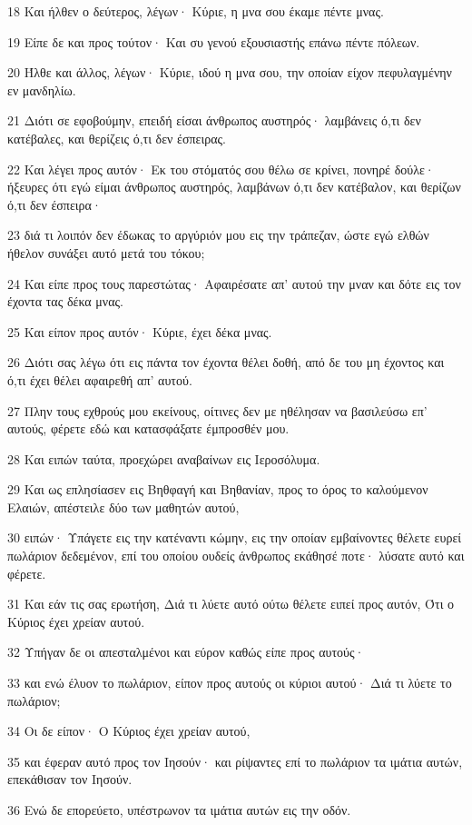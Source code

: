 \par 18 Και ήλθεν ο δεύτερος, λέγων· Κύριε, η μνα σου έκαμε πέντε μνας.
\par 19 Είπε δε και προς τούτον· Και συ γενού εξουσιαστής επάνω πέντε πόλεων.
\par 20 Ήλθε και άλλος, λέγων· Κύριε, ιδού η μνα σου, την οποίαν είχον πεφυλαγμένην εν μανδηλίω.
\par 21 Διότι σε εφοβούμην, επειδή είσαι άνθρωπος αυστηρός· λαμβάνεις ό,τι δεν κατέβαλες, και θερίζεις ό,τι δεν έσπειρας.
\par 22 Και λέγει προς αυτόν· Εκ του στόματός σου θέλω σε κρίνει, πονηρέ δούλε· ήξευρες ότι εγώ είμαι άνθρωπος αυστηρός, λαμβάνων ό,τι δεν κατέβαλον, και θερίζων ό,τι δεν έσπειρα·
\par 23 διά τι λοιπόν δεν έδωκας το αργύριόν μου εις την τράπεζαν, ώστε εγώ ελθών ήθελον συνάξει αυτό μετά του τόκου;
\par 24 Και είπε προς τους παρεστώτας· Αφαιρέσατε απ' αυτού την μναν και δότε εις τον έχοντα τας δέκα μνας.
\par 25 Και είπον προς αυτόν· Κύριε, έχει δέκα μνας.
\par 26 Διότι σας λέγω ότι εις πάντα τον έχοντα θέλει δοθή, από δε του μη έχοντος και ό,τι έχει θέλει αφαιρεθή απ' αυτού.
\par 27 Πλην τους εχθρούς μου εκείνους, οίτινες δεν με ηθέλησαν να βασιλεύσω επ' αυτούς, φέρετε εδώ και κατασφάξατε έμπροσθέν μου.
\par 28 Και ειπών ταύτα, προεχώρει αναβαίνων εις Ιεροσόλυμα.
\par 29 Και ως επλησίασεν εις Βηθφαγή και Βηθανίαν, προς το όρος το καλούμενον Ελαιών, απέστειλε δύο των μαθητών αυτού,
\par 30 ειπών· Υπάγετε εις την κατέναντι κώμην, εις την οποίαν εμβαίνοντες θέλετε ευρεί πωλάριον δεδεμένον, επί του οποίου ουδείς άνθρωπος εκάθησέ ποτε· λύσατε αυτό και φέρετε.
\par 31 Και εάν τις σας ερωτήση, Διά τι λύετε αυτό ούτω θέλετε ειπεί προς αυτόν, Ότι ο Κύριος έχει χρείαν αυτού.
\par 32 Υπήγαν δε οι απεσταλμένοι και εύρον καθώς είπε προς αυτούς·
\par 33 και ενώ έλυον το πωλάριον, είπον προς αυτούς οι κύριοι αυτού· Διά τι λύετε το πωλάριον;
\par 34 Οι δε είπον· Ο Κύριος έχει χρείαν αυτού,
\par 35 και έφεραν αυτό προς τον Ιησούν· και ρίψαντες επί το πωλάριον τα ιμάτια αυτών, επεκάθισαν τον Ιησούν.
\par 36 Ενώ δε επορεύετο, υπέστρωνον τα ιμάτια αυτών εις την οδόν.
